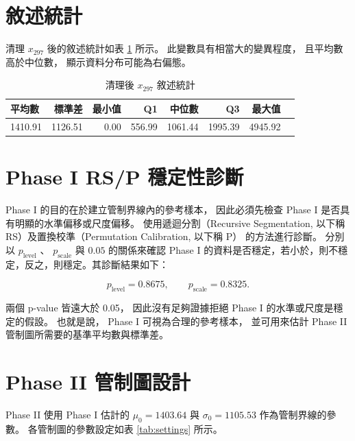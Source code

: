 \documentclass[a4paper, 12pt]{report}  %
\begin{document}
\section*{敘述統計}

清理 \(x_{297}\) 後的敘述統計如表 \ref{tab:summary} 所示。
此變數具有相當大的變異程度，
且平均數高於中位數，
顯示資料分布可能為右偏態。

\begin{table}[H]
  \centering
  \caption{清理後 \(x_{297}\) 敘述統計}
  \vspace{0.5em}
  \label{tab:summary}
  \begin{tabular}{|l|r|r|r|r|r|r|r|}
    \hline
    平均數 & 標準差 & 最小值 & Q1 & 中位數 & Q3 & 最大值 \\
    \hline
    1410.91 & 1126.51 & 0.00 & 556.99 & 1061.44 & 1995.39 & 4945.92 \\
    \hline
  \end{tabular}
\end{table}



\section*{Phase I RS/P 穩定性診斷}

Phase I 的目的在於建立管制界線內的參考樣本，
因此必須先檢查 Phase I 是否具有明顯的水準偏移或尺度偏移。
使用遞迴分割（Recursive Segmentation, 以下稱 RS）及置換校準（Permutation Calibration, 以下稱 P） 的方法進行診斷。
分別以 $p_{\text{level}}$ 、 $p_{\text{scale}}$ 與 $0.05$ 的關係來確認 Phase I 的資料是否穩定，若小於，則不穩定，反之，則穩定。其診斷結果如下：

\[
  p_{\text{level}} = 0.8675,\qquad
  p_{\text{scale}} = 0.8325.
\]

兩個 p-value 皆遠大於 0.05，
因此沒有足夠證據拒絕 Phase I 的水準或尺度是穩定的假設。
也就是說，
Phase I 可視為合理的參考樣本，
並可用來估計 Phase II 管制圖所需要的基準平均數與標準差。

\section*{Phase II 管制圖設計}

Phase II 使用 Phase I 估計的 \(\mu_0=1403.64\) 與 \(\sigma_0=1105.53\) 作為管制界線的參數。
各管制圖的參數設定如表 \ref{tab:settings} 所示。
\end{document}
